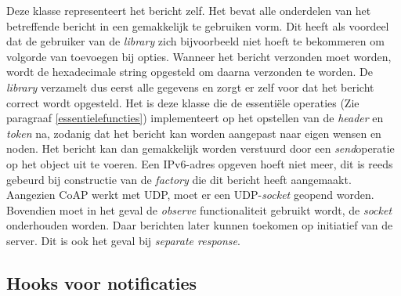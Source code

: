 Deze klasse representeert het bericht zelf. Het bevat alle onderdelen van het betreffende bericht in een gemakkelijk te gebruiken vorm. Dit heeft als voordeel dat de gebruiker van de \textit{library} zich bijvoorbeeld niet hoeft te bekommeren om volgorde van toevoegen bij opties. Wanneer het bericht verzonden moet worden, wordt de hexadecimale string opgesteld om daarna verzonden te worden. De \textit{library} verzamelt dus eerst alle gegevens en zorgt er zelf voor dat het bericht correct wordt opgesteld. Het is deze klasse die de essenti\"{e}le operaties (Zie paragraaf \ref{essentielefuncties}) implementeert op het opstellen van de \textit{header} en \textit{token} na, zodanig dat het bericht kan worden aangepast naar eigen wensen en noden. Het bericht kan dan gemakkelijk worden verstuurd door een \textit{send}operatie op het object uit te voeren. Een IPv6-adres opgeven hoeft niet meer, dit is reeds gebeurd bij constructie van de \textit{factory} die dit bericht heeft aangemaakt. Aangezien CoAP werkt met UDP, moet er een UDP-\textit{socket} geopend worden. Bovendien moet in het geval de \textit{observe} functionaliteit gebruikt wordt, de \textit{socket} onderhouden worden. Daar berichten later kunnen toekomen op initiatief van de server. Dit is ook het geval bij \textit{separate response}.

\subsection{Hooks voor notificaties} \label{observe_hooks}

